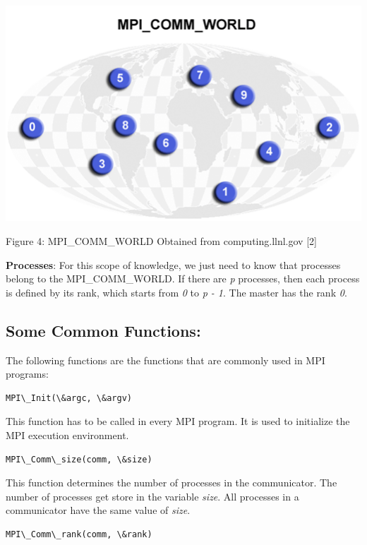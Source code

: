 \documentclass[letterpaper,10pt,openany,oneside]{sphinxmanual}
\begin{document}
{\hfill\includegraphics{MPI_COMM_WORLD.png}\hfill}

\begin{center}Figure 4: MPI\_COMM\_WORLD Obtained from computing.llnl.gov {[}2{]}
\end{center}
\textbf{Processes}: For this scope of knowledge, we just need to know that processes belong to the MPI\_COMM\_WORLD. If there are \emph{p} processes, then each process is defined by its rank, which starts from \emph{0} to \emph{p - 1}. The master has the rank \emph{0}.


\subsection{Some Common Functions:}
\label{introMPI/introMPI:some-common-functions}
The following functions are the functions that are commonly used in MPI programs:

\begin{Verbatim}[commandchars=\\\{\}]
MPI\_Init(\&argc, \&argv)
\end{Verbatim}

This function has to be called in every MPI program. It is used to initialize the MPI execution environment.

\begin{Verbatim}[commandchars=\\\{\}]
MPI\_Comm\_size(comm, \&size)
\end{Verbatim}

This function determines the number of processes in the communicator. The number of processes get store in the variable \emph{size}. All processes in a communicator have the same value of \emph{size}.

\begin{Verbatim}[commandchars=\\\{\}]
MPI\_Comm\_rank(comm, \&rank)
\end{Verbatim}
\end{document}
